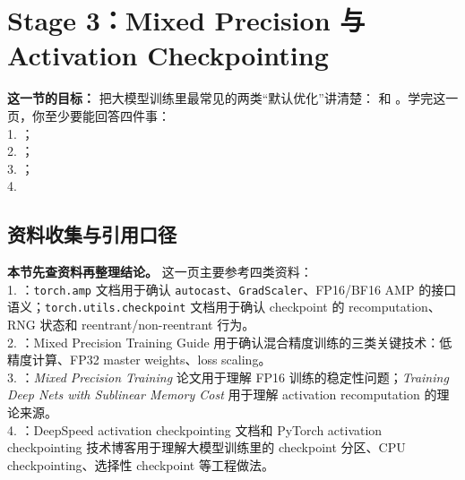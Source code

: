 
\section{Stage 3：Mixed Precision 与 Activation Checkpointing}

\begin{conceptbox}
\textbf{这一节的目标：} 把大模型训练里最常见的两类“默认优化”讲清楚： 和 。学完这一页，你至少要能回答四件事：\\
1. ；\\
2. ；\\
3. ；\\
4. 
\end{conceptbox}


\subsection*{资料收集与引用口径}

\begin{conceptbox}
\textbf{本节先查资料再整理结论。} 这一页主要参考四类资料：\\
1. ：\texttt{torch.amp} 文档用于确认 \texttt{autocast}、\texttt{GradScaler}、FP16/BF16 AMP 的接口语义；\texttt{torch.utils.checkpoint} 文档用于确认 checkpoint 的 recomputation、RNG 状态和 reentrant/non-reentrant 行为。\\
2. ：Mixed Precision Training Guide 用于确认混合精度训练的三类关键技术：低精度计算、FP32 master weights、loss scaling。\\
3. ：\emph{Mixed Precision Training} 论文用于理解 FP16 训练的稳定性问题；\emph{Training Deep Nets with Sublinear Memory Cost} 用于理解 activation recomputation 的理论来源。\\
4. ：DeepSpeed activation checkpointing 文档和 PyTorch activation checkpointing 技术博客用于理解大模型训练里的 checkpoint 分区、CPU checkpointing、选择性 checkpoint 等工程做法。
\end{conceptbox}

